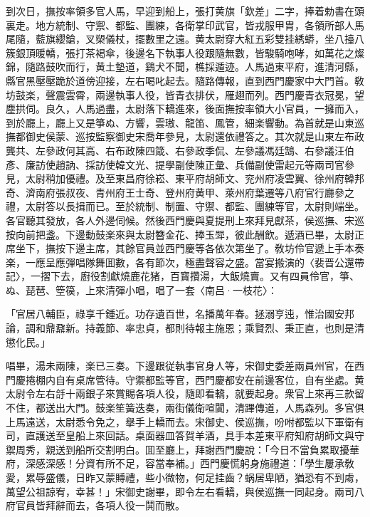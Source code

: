 到次日，撫按率領多官人馬，早迎到船上，張打黄旗「欽差」二字，捧着勅書在頭裏走。地方統制、守禦、都監、團練，各衛掌印武官，皆戎服甲胄，各領所部人馬尾隨，藍旗纓鎗，叉槊儀杖，擺數里之遠。黄太尉穿大紅五彩雙挂綉蟒，坐八擡八簇銀頂暖轎，張打茶褐傘，後邊名下執事人役跟隨無數，皆駿騎咆哮，如萬花之燦錦，隨路鼓吹而行，黄土墊道，鷄犬不聞，樵採遁迹。人馬過東平府，進清河縣，縣官黑壓壓跪於道傍迎接，左右喝叱起去。隨路傳報，直到西門慶家中大門首。敎坊鼓楽，聲震雲霄，兩邊執事人役，皆青衣排伏，雁翅而列。西門慶青衣冠冕，望塵拱伺。良久，人馬過盡，太尉落下轎進來，後面撫按率領大小官員，一擁而入，到於廳上，廳上又是箏ぬ、方響，雲璈、龍笛、鳳管，細楽響動。為首就是山東巡撫都御史侯蒙、巡按監察御史宋喬年參見，太尉還依禮答之。其次就是山東左布政龔共、左參政何其高、右布政陳四箴、右參政季侃、左參議馮廷鵠、右參議汪伯彥、廉訪使趙訥、採訪使韓文光、提學副使陳正彙、兵備副使雷起元等兩司官參見，太尉稍加優禮。及至東昌府徐崧、東平府胡師文、兖州府凌雲翼、徐州府韓邦奇、濟南府張叔夜、青州府王士奇、登州府黄甲、萊州府葉遷等八府官行廳參之禮，太尉答以長揖而已。至於統制、制置、守禦、都監、團練等官，太尉則端坐。各官聽其發放，各人外邊伺候。然後西門慶與夏提刑上來拜見獻茶，侯巡撫、宋巡按向前把盞。下邊動鼓楽來與太尉簪金花、捧玉斝，彼此酬飲。遞酒已畢，太尉正席坐下，撫按下邊主席，其餘官員並西門慶等各依次第坐了。敎坊伶官遞上手本奏楽，一應呈應彈唱隊舞囬數，各有節次，極盡聲容之盛。當宴搬演的〈裴晋公還帶記〉，一摺下去，廚役割獻燒鹿花猪，百寳攢湯，大飯燒賣。又有四員伶官，箏、ぬ、琵琶、箜篌，上來清彈小唱，唱了一套〈南吕·一枝花〉：

「官居八輔臣，祿享千鍾近。功存遺百世，名播萬年春。拯溺亨迍，惟治國安邦論，調和鼎鼐新。持義節、率忠貞，都則待報主施恩；乘賢烈、秉正直，也則是清懲化民。」

唱畢，湯未兩陳，楽已三奏。下邊跟従執事官身人等，宋御史委差兩員州官，在西門慶捲棚内自有桌席管待。守禦都監等官，西門慶都安在前邊客位，自有坐處。黄太尉令左右㧱十兩銀子來賞賜各項人役，隨即看轎，就要起身。衆官上來再三款留不住，都送出大門。鼓楽笙簧迭奏，兩街儀衛喧闐，清蹕傳道，人馬森列。多官俱上馬遠送，太尉悉令免之，擧手上轎而去。宋御史、侯巡撫，吩咐都監以下軍衛有司，直護送至皇船上來回話。桌面器皿答賀羊酒，具手本差東平府知府胡師文與守禦周秀，親送到船所交割明白。囬至廳上，拜謝西門慶說：「今日不當負累取擾華府，深感深感！分資有所不足，容當奉補。」西門慶慌躬身施禮道：「學生屢承敎愛，累辱盛儀，日昨又蒙賻禮，些小微物，何足挂齒？蜗居卑陋，猶恐有不到䖏，萬望公祖諒宥，幸甚！」宋御史謝畢，即令左右看轎，與侯巡撫一同起身。兩司八府官員皆拜辭而去，各項人役一鬨而散。

